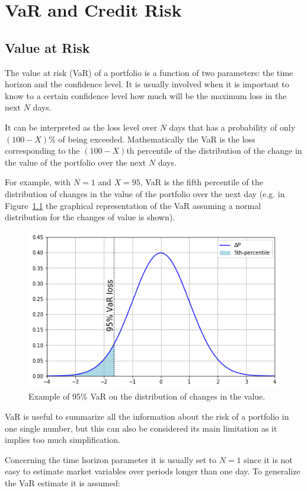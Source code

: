 \chapter{VaR and Credit Risk}\label{var-and-credit-risk}

\section{Value at Risk}\label{value-at-risk}

The value at risk (VaR) of a portfolio is a function of two parameters:
the time horizon and the confidence level. It is usually involved when it
is important to know to a certain confidence level how
much will be the maximum loss in the next $N$ days. 

It can be interpreted as the loss level over \(N\) days that has a 
probability of only \((100 - X)\%\) of being exceeded.
Mathematically the VaR is the loss corresponding to the
\((100-X)\textrm{th}\) percentile of the distribution of the change in
the value of the portfolio over the next \(N\) days. 

For example, with \(N=1\) and \(X=95\), VaR is the fifth percentile of the distribution of
changes in the value of the portfolio over the next day (e.g. in Figure~\ref{fig:var_loss}
the graphical representation of the VaR assuming a normal
distribution for the changes of value is shown).

\begin{figure}[htb]
\centering
  \includegraphics[width=0.6\linewidth]{figures/95_var.png}
  \caption{Example of 95\% VaR on the distribution of changes in the value.}
  \label{fig:var_loss}
\end{figure}
    
VaR is useful to summarize all the information about the risk of a
portfolio in one single number, but this can also be considered its main
limitation as it implies too much simplification.

Concerning the time horizon parameter it is usually set to \(N=1\) since
it is not easy to estimate market variables over periods longer than one
day. To generalize the VaR estimate it is assumed:


